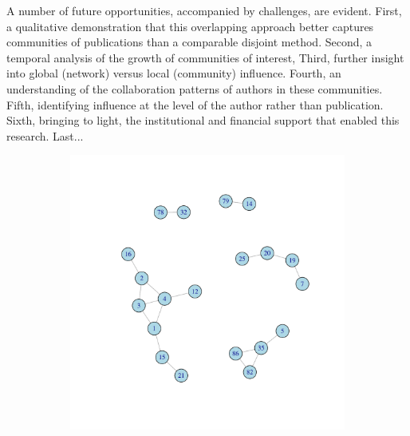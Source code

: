 \documentclass[12pt, oneside]{article}   	%
\begin{document}
A number of future opportunities, accompanied by challenges, are evident. First, a qualitative demonstration that this overlapping approach better captures communities of publications than a comparable disjoint method. Second, a temporal analysis of the growth of communities of interest,  Third, further insight into global (network) versus local (community) influence. 
Fourth, an understanding of the collaboration patterns of authors in these communities. Fifth, identifying influence at the level of the author rather than publication. Sixth, bringing to light, the institutional and financial support that enabled this research. Last...


\begin{figure}[H]
	\centering
	\begin{subfigure}[t]{0.48\textwidth}
	 \centering
	 \includegraphics[width=\linewidth]{ikc10_m_pw.pdf} 
	 \end{subfigure}
 \hfill
	\begin{subfigure}[t]{0.48\textwidth}
        \centering

\end{subfigure}
\end{figure}
\end{document}
